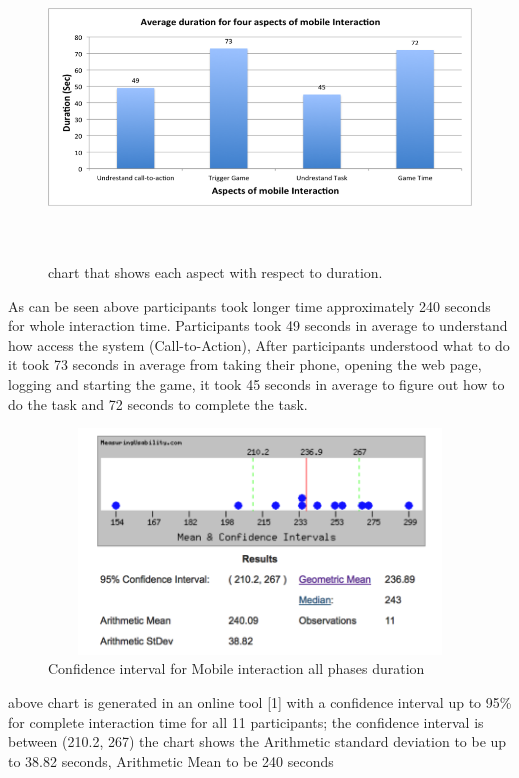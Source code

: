\begin{figure}[H]
\centering
\includegraphics[width=12cm,height=8cm]{Figures/6/mobile_average}%
 \caption{chart that shows each aspect with respect to duration. }%
 \label{fig:mobile_average}%
\end{figure}

As can be seen above participants took longer time approximately 240 seconds for whole interaction time. Participants took 49 seconds in average to understand how access the system (Call-to-Action), After participants understood what to do it took 73 seconds in average from taking their phone, opening the web page, logging and starting the game, it took 45 seconds in average to figure out how to do the task and 72 seconds to complete the task.


\begin{figure}[H]
\centering
\includegraphics[width=12cm,height=6cm]{Figures/6/mobile_mean}%
 \caption{Confidence interval for Mobile interaction all phases duration }%
 \label{fig:mobile_mean}%
\end{figure}

above chart is generated in an online tool [1] with a confidence interval up to 95\% for complete interaction time for all 11 participants; the confidence interval is between (210.2, 267) the chart shows the Arithmetic standard deviation to be up to 38.82 seconds, Arithmetic Mean to be 240 seconds

